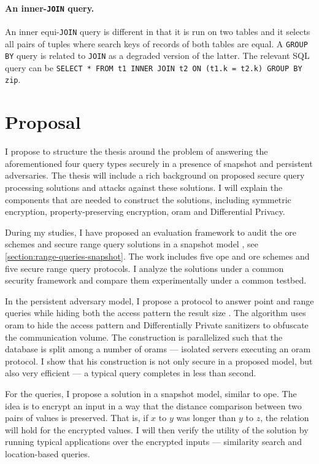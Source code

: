 		\paragraph*{An inner-\texttt{JOIN} query.}
			An inner equi-\texttt{JOIN} query is different in that it is run on two tables and it selects all pairs of tuples where search keys of records of both tables are equal.
			A \texttt{GROUP BY} query is related to \texttt{JOIN} as a degraded version of the latter.
			The relevant SQL query can be \texttt{SELECT * FROM t1 INNER JOIN t2 ON (t1.k = t2.k) GROUP BY zip}.

	\section{Proposal}

		I propose to structure the thesis around the problem of answering the aforementioned four query types securely in a presence of snapshot and persistent adversaries.
		The thesis will include a rich background on proposed secure query processing solutions and attacks against these solutions.
		I will explain the components that are needed to construct the solutions, including symmetric encryption, property-preserving encryption, \Gls{oram} and Differential Privacy.

		During my studies, I have proposed an evaluation framework to audit the \gls{ore} schemes and secure range query solutions in a snapshot model \cite{ore-benchmark-17}, see \cref{section:range-queries-snapshot}.
		The work includes five \gls{ope} and \gls{ore} schemes and five secure range query protocols.
		I analyze the solutions under a common security framework and compare them experimentally under a common testbed.

		In the persistent adversary model, I propose a protocol to answer point and range queries while hiding both the access pattern the result size \cite{epsolute}.
		The algorithm uses \Gls{oram} to hide the access pattern and Differentially Private sanitizers to obfuscate the communication volume.
		The construction is parallelized such that the database is split among a number of \Glspl{oram} --- isolated servers executing an \Gls{oram} protocol.
		I show that his construction is not only secure in a proposed model, but also very efficient --- a typical query completes in less than second.

		For the \knn{} queries, I propose a solution in a snapshot model, similar to \gls{ope}.
		The idea is to encrypt an input in a way that the distance comparison between two pairs of values is preserved.
		That is, if $x$ to $y$ was longer than $y$ to $z$, the relation will hold for the encrypted values.
		I will then verify the utility of the solution by running typical \knn{} applications over the encrypted inputs --- similarity search and location-based queries.

